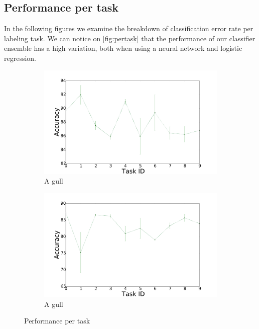 \documentclass{llncs}
\begin{document}
\subsection{Performance per task}

In the following figures we examine the breakdown of classification error rate per labeling task. We can notice on \autoref{fig:pertask} that the performance of our classifier ensemble has a high variation, both when using a neural network and logistic regression.

\begin{figure}[!htb]
    \centering
    \begin{subfigure}[b]{0.45\textwidth}
        \includegraphics[width=\textwidth]{figures/task_logreg}
        \caption{A gull}
    \end{subfigure}
    \begin{subfigure}[b]{0.45\textwidth}
        \includegraphics[width=\textwidth]{figures/task_mlp}
        \caption{A gull}
    \end{subfigure}
    \caption{Performance per task}
    \label{fig:pertask}
    
\end{figure}
\end{document}
